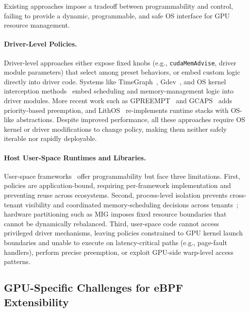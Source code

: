 Existing approaches impose a tradeoff between programmability and control, failing to provide a dynamic, programmable, and safe OS interface for GPU resource management.

\paragraph{Driver-Level Policies.}
Driver-level approaches either expose fixed knobs (e.g., \texttt{cudaMemAdvise}, driver module parameters) that select among preset behaviors, or embed custom logic directly into driver code. Systems like TimeGraph~\cite{kato2011timegraph}, Gdev~\cite{kato2012gdev}, and OS kernel interception methods~\cite{kernelintercept} embed scheduling and memory-management logic into driver modules. More recent work such as GPREEMPT~\cite{fan2025gpreempt} and GCAPS~\cite{wang2024gcaps} adds priority-based preemption, and LithOS~\cite{coppock2025lithos} re-implements runtime stacks with OS-like abstractions. Despite improved performance, all these approaches require OS kernel or driver modifications to change policy, making them neither safely iterable nor rapidly deployable.

\paragraph{Host User-Space Runtimes and Libraries.}
User-space frameworks~\cite{ng2023paella,gim2025pie,shen2025xsched,chen2025ktransformers,coppock2025lithos} offer programmability but face three limitations. First, policies are application-bound, requiring per-framework implementation and preventing reuse across ecosystems. Second, process-level isolation prevents cross-tenant visibility and coordinated memory-scheduling decisions across tenants~\cite{xiao2018gandiva,yu2020fine}; hardware partitioning such as MIG imposes fixed resource boundaries that cannot be dynamically rebalanced. Third, user-space code cannot access privileged driver mechanisms, leaving policies constrained to GPU kernel launch boundaries and unable to execute on latency-critical paths (e.g., page-fault handlers), perform precise preemption, or exploit GPU-side warp-level access patterns.

\subsection{GPU-Specific Challenges for eBPF Extensibility}
\label{sec:motivation-challenges}

